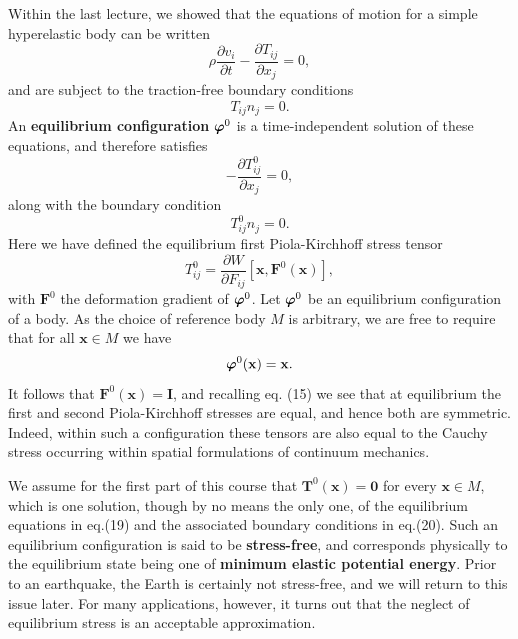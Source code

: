 \documentclass [a4paper,12pt]{paper}
\begin{document}
Within the last lecture, we showed that the equations of motion for a simple hyperelastic body can be written
\begin{equation}
\rho\frac{\partial v_{i}}{\partial t} - \frac{\partial T_{ij}}{\partial x_{j}} = 0,
\end{equation}
and are subject to the traction-free boundary conditions
\begin{equation}
T_{ij}\hat{n}_{j} = 0.
\end{equation}
An \textbf{equilibrium configuration} $\bm{\varphi}^0$ is a time-independent solution of these equations, and therefore satisfies
\begin{equation}
-\frac{\partial T_{ij}^{0}}{\partial x_{j}} = 0,
\end{equation}
along with the boundary condition
\begin{equation}
T_{ij}^{0}\hat{n}_{j} = 0.
\end{equation}
Here we have defined the equilibrium first Piola-Kirchhoff stress tensor
\begin{equation}
T_{ij}^{0} = \frac{\partial W}{\partial F_{ij}}[\mathbf{x}, \mathbf{F}^0(\mathbf{x})],
\end{equation}
with $\mathbf{F}^0$ the deformation gradient of $\bm{\varphi}^0$. Let $\bm{\varphi}^0$ be an equilibrium configuration of a body. 
As the choice of reference body $M$ is arbitrary, we are free to require that for all $\mathbf{x} \in M$ we have
\begin{equation}
\bm{\varphi}^0(\mathbf{x}) = \mathbf{x}.
\end{equation}
It follows that $\mathbf{F}^0(\mathbf{x}) = \mathbf{I}$, and recalling eq. (15) we see that at equilibrium the first 
and second Piola-Kirchhoff stresses are equal, and hence both are symmetric. Indeed, within such a configuration these
tensors are also equal to the Cauchy stress occurring within spatial formulations of continuum mechanics.



We assume for the first part of this course that $\mathbf{T}^0(\mathbf{x}) = \mathbf{0}$ for every $\mathbf{x} \in M$,
 which is one solution, though by no means the only one, of the equilibrium equations in eq.(19) and the associated boundary conditions in eq.(20). 
 Such an equilibrium configuration is said to be \textbf{stress-free}, and corresponds physically to the equilibrium state being one 
 of \textbf{minimum elastic potential energy}. Prior to an earthquake, the Earth is certainly not stress-free, and we will return to this 
 issue later. For many applications, however, it turns out that the neglect of equilibrium stress is an acceptable approximation.
\end{document}
